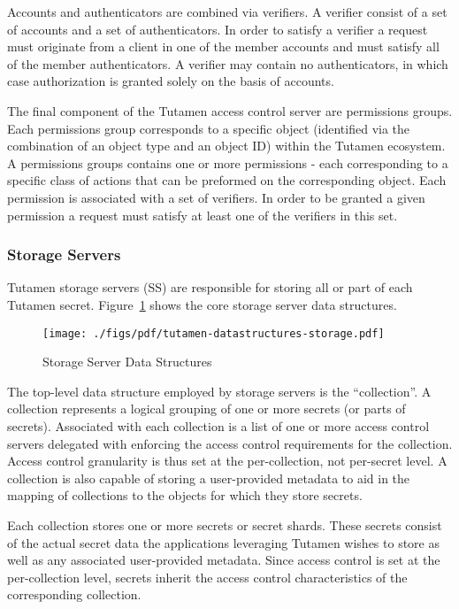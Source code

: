 Accounts and authenticators are combined via verifiers. A verifier
consist of a set of accounts and a set of authenticators. In order to
satisfy a verifier a request must originate from a client in one of
the member accounts and must satisfy all of the member
authenticators. A verifier may contain no authenticators, in which
case authorization is granted solely on the basis of accounts.

The final component of the Tutamen access control server are
permissions groups. Each permissions group corresponds to a specific
object (identified via the combination of an object type and an object
ID) within the Tutamen ecosystem. A permissions groups contains one or
more permissions - each corresponding to a specific class of actions
that can be preformed on the corresponding object. Each permission is
associated with a set of verifiers. In order to be granted a given
permission a request must satisfy at least one of the verifiers in
this set.

\subsubsection{Storage Servers}
\label{sec:tutamen:arch:ss}

Tutamen storage servers (SS) are responsible for storing all or part
of each Tutamen secret. Figure~\ref{fig:tutamen:storagestructs} shows
the core storage server data structures.

\begin{figure}[th]
  \centering
  \texttt{[image: ./figs/pdf/tutamen-datastructures-storage.pdf]}
  \caption{Storage Server Data Structures}
  \label{fig:tutamen:storagestructs}
\end{figure}

The top-level data structure employed by storage servers is the
``collection''. A collection represents a logical grouping of one or
more secrets (or parts of secrets). Associated with each collection is
a list of one or more access control servers delegated with enforcing
the access control requirements for the collection. Access control
granularity is thus set at the per-collection, not per-secret level. A
collection is also capable of storing a user-provided metadata to aid
in the mapping of collections to the objects for which they store
secrets.

Each collection stores one or more secrets or secret shards. These
secrets consist of the actual secret data the applications leveraging
Tutamen wishes to store as well as any associated user-provided
metadata. Since access control is set at the per-collection level,
secrets inherit the access control characteristics of the
corresponding collection.

